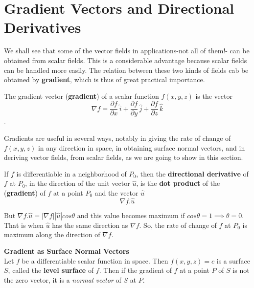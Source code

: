 \documentclass[aima331_lecturenotes_ku.tex]{subfiles}
\begin{document}
\section{Gradient Vectors and Directional Derivatives}
We shall see that some of the vector fields in applications-not all of them!- can be obtained from scalar fields. This is a considerable advantage because scalar fields can be handled more easily. The relation between these two kinds of fields cab be obtained by \textbf{gradient}, which is thus of great practical importance.
\begin{definition}
  The gradient vector (\textbf{gradient}) of a scalar function \(f(x,y,z)\) is the vector \[\nabla f = \frac{\partial f}{\partial x}\, \hat{i} + \frac{\partial f}{\partial y}\, \hat{j} + \frac{\partial f}{\partial z}\, \hat{k}\].
\end{definition}
Gradients are useful in several ways, notably in giving the rate of change of $f(x,y,z)$ in any direction in space, in obtaining surface normal vectors, and in deriving vector fields, from scalar fields, as we are going to show in this section.
\begin{mdframed}
\begin{definition}
  If \(f\) is differentiable in a neighborhood of \(P_0\), then the \textbf{directional derivative} of \(f\) at \(P_0\), in the direction of the unit vector \(\hat{u}\), is the \textbf{dot product} of the (\textbf{gradient}) of \(f\) at a point \(P_0\) and the vector \(\hat{u}\)
  \[ \nabla f . \hat{u}\]
\end{definition}
\end{mdframed}
But $\nabla f . \hat{u} = |\nabla f||\hat{u}|cos\theta$ and this value becomes maximum if $cos\theta=1 \implies \theta = 0$. That is when $\hat{u}$ has the same direction as $\nabla f$. So, the rate of change of $f$ at $P_0$ is maximum along the direction of $\nabla f$.
\begin{mdframed}
  \textbf{Gradient as Surface Normal Vectors} \\[1mm]
  Let $f$ be a differentiable scalar function in space. Then $f(x,y,z)=c$ is a surface $S$, called the \textbf{level surface} of $f$. Then if the gradient of $f$ at a point $P$ of $S$ is not the zero vector, it is a \textit{normal vector} of $S$ at $P$.
\end{mdframed}
\end{document}
